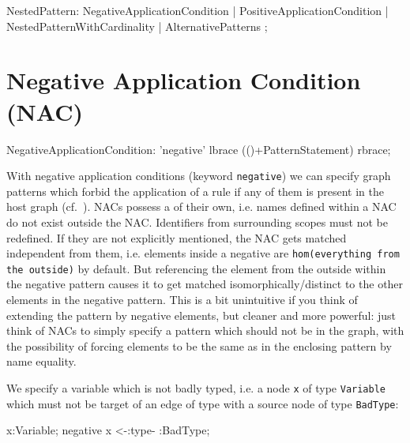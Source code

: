 \begin{rail}  
  NestedPattern: 
    NegativeApplicationCondition |
    PositiveApplicationCondition |
    NestedPatternWithCardinality |
    AlternativePatterns 
    ;
\end{rail}


\section{Negative Application Condition (NAC)}
\label{nac}

\begin{rail}  
  NegativeApplicationCondition: 
    'negative' lbrace (()+PatternStatement) rbrace;
\end{rail}

With negative application conditions (keyword \texttt{negative}) we can specify graph patterns which forbid the application of a rule if any of them is present in the host graph (cf.~\cite{adam}). 
NACs possess a  of their own, i.e. names defined within a NAC do not exist outside the NAC. 
Identifiers from surrounding scopes must not be redefined.
If they are not explicitly mentioned, the NAC gets matched independent from them, i.e. elements inside a negative are \texttt{hom(everything from the outside)} by default.
But referencing the element from the outside within the negative pattern causes it to get matched isomorphically/distinct to the other elements in the negative pattern. 
This is a bit unintuitive if you think of extending the pattern by negative elements, but cleaner and more powerful: 
just think of NACs to simply specify a pattern which should not be in the graph, with the possibility of forcing elements to be the same as in the enclosing pattern by name equality.

  \begin{example}
    We specify a variable which is not badly typed, i.e. a node \texttt{x} of type \texttt{Variable} which must not be target of an edge of type  with a source node of type \texttt{BadType}:
    \begin{grgen}
  x:Variable;
  negative {
    x <-:type- :BadType;
  }
    \end{grgen}
  \end{example}
 
